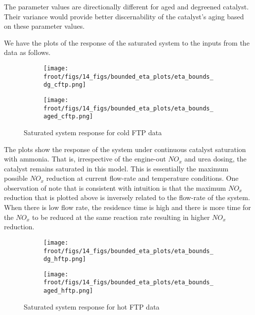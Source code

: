 The parameter values are directionally different for aged and degreened catalyst. Their variance would provide better discernability of the catalyst's aging based on these parameter values.

We have the plots of the response of the saturated system to the inputs from the data as follows.

\begin{figure}[H]
        \begin{minipage}{0.49\textwidth}
                \begin{figure}[H]
                        \centering
                        \texttt{[image: \\froot/figs/14\_figs/bounded\_eta\_plots/eta\_bounds\_dg\_cftp.png]}
                \end{figure}
        \end{minipage}
        \begin{minipage}{0.49\textwidth}
                \begin{figure}[H]
                        \centering
                        \texttt{[image: \\froot/figs/14\_figs/bounded\_eta\_plots/eta\_bounds\_aged\_cftp.png]}
                \end{figure}
        \end{minipage}
        \caption{Saturated system response for cold FTP data}
\end{figure}

The plots show the response of the system under continuous catalyst saturation with ammonia. That is, irrespective of
the engine-out $NO_x$ and urea dosing, the catalyst remains saturated in this model. This is essentially the maximum
possible $NO_x$ reduction at current flow-rate and temperature conditions. One observation of note that is consistent
with intuition is that the maximum $NO_x$ reduction that is plotted above is inversely related to the flow-rate of the
system. When there is low flow rate, the residence time is high and there is more time for the $NO_x$ to be reduced at
the same reaction rate resulting in higher $NO_x$ reduction.

\begin{figure}[H]
        \begin{minipage}{0.49\textwidth}
                \begin{figure}[H]
                        \centering
                        \texttt{[image: \\froot/figs/14\_figs/bounded\_eta\_plots/eta\_bounds\_dg\_hftp.png]}
                \end{figure}
        \end{minipage}
        \begin{minipage}{0.49\textwidth}
                \begin{figure}[H]
                        \centering
                        \texttt{[image: \\froot/figs/14\_figs/bounded\_eta\_plots/eta\_bounds\_aged\_hftp.png]}
                \end{figure}
        \end{minipage}
        \caption{Saturated system response for hot FTP data}
\end{figure}

